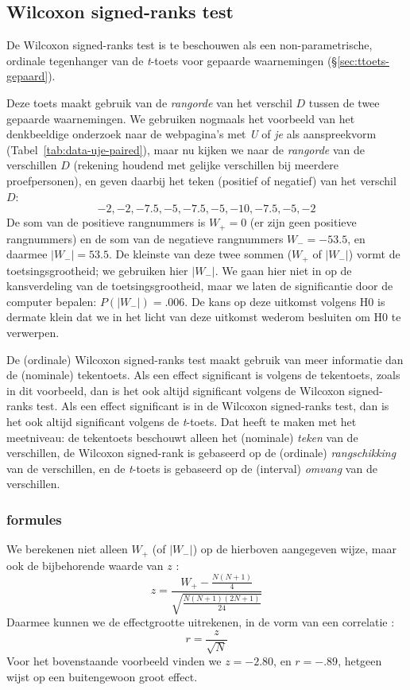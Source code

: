\documentclass[
]{book}
\begin{document}
\subsection{Wilcoxon signed-ranks test}\label{sec:Wilcoxon-signed-rank}

De Wilcoxon signed-ranks test is te beschouwen als een
non-parametrische, ordinale tegenhanger van de \emph{t}-toets voor gepaarde
waarnemingen (§\ref{sec:ttoets-gepaard}).

Deze toets maakt gebruik van de \emph{rangorde} van het verschil \(D\) tussen
de twee gepaarde waarnemingen. We gebruiken nogmaals het voorbeeld van
het denkbeeldige onderzoek naar de webpagina's met \emph{U} of \emph{je} als
aanspreekvorm
(Tabel~\ref{tab:data-uje-paired}), maar nu kijken we naar de \emph{rangorde}
van de verschillen \(D\) (rekening houdend met gelijke verschillen bij
meerdere proefpersonen), en geven daarbij het teken (positief of
negatief) van het verschil \(D\):
\[-2, -2, -7.5, -5, -7.5, -5, -10, -7.5, -5, -2\]
De som van de positieve rangnummers is \(W_+=0\) (er zijn geen positieve rangnummers)
en de som van de negatieve rangnummers \(W_-= -53.5\), en daarmee \(|W_-|=53.5\). De kleinste van
deze twee sommen (\(W_+\) of \(|W_-|\)) vormt de toetsingsgrootheid; we gebruiken hier \(|W_-|\).
We gaan
hier niet in op de kansverdeling van de toetsingsgrootheid, maar we
laten de significantie door de computer bepalen: \(P(|W_-|)=.006\). De kans
op deze uitkomst volgens H0 is dermate klein dat we in het licht van
deze uitkomst wederom besluiten om H0 te verwerpen.

De (ordinale) Wilcoxon signed-ranks test maakt gebruik van meer
informatie dan de (nominale) tekentoets. Als een effect significant is
volgens de tekentoets, zoals in dit voorbeeld, dan is het ook altijd
significant volgens de Wilcoxon signed-ranks test. Als een effect
significant is in de Wilcoxon signed-ranks test, dan is het ook altijd
significant volgens de \emph{t}-toets. Dat heeft te maken met het meetniveau: de
tekentoets beschouwt alleen het (nominale) \emph{teken} van de verschillen, de
Wilcoxon signed-rank is gebaseerd op de (ordinale) \emph{rangschikking} van de
verschillen, en de \emph{t}-toets is gebaseerd op de (interval) \emph{omvang} van de
verschillen.

\subsubsection{formules}\label{formules-7}

We berekenen niet alleen \(W_+\) (of \(|W_-|\)) op de hierboven aangegeven wijze,
maar ook de bijbehorende waarde van \(z\) \citep{Ferg89}:
\begin{equation}
  \label{eq:Wilcoxon-signedrank-z}
  z = \frac{ W_+ - \frac{N(N+1)}{4} } { \sqrt{ \frac{N(N+1)(2N+1)}{24} } }
\end{equation}
Daarmee kunnen we de effectgrootte uitrekenen, in de vorm van een
correlatie \citep[ Eq.2.18]{Rose91}:
\begin{equation}
  \label{eq:es-z2r}
    r = \frac {z} {\sqrt{N}}
\end{equation}
Voor het bovenstaande voorbeeld vinden we
\(z=-2.80\), en \(r=-.89\), hetgeen wijst op een buitengewoon groot effect.
\end{document}
